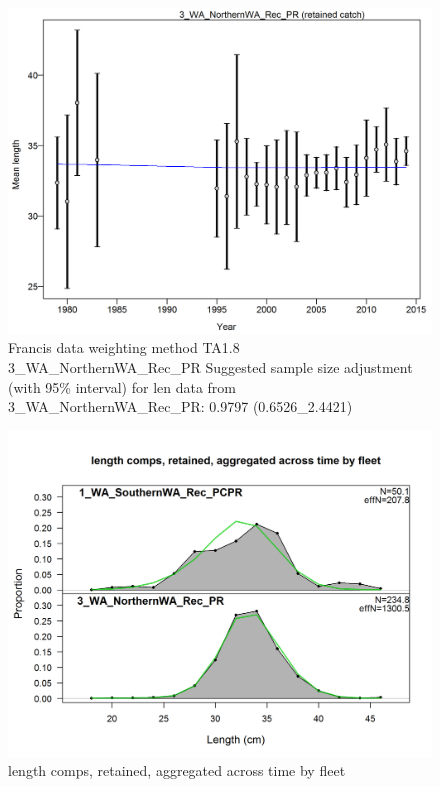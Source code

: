 \documentclass[12pt,]{article}
\begin{document}
\begin{figure}[htbp]
\centering
\includegraphics{./r4ss/plots_mod1/comp_lenfit_data_weighting_TA1.8_3_WA_NorthernWA_Rec_PR.png}
\caption{Francis data weighting method TA1.8 3\_WA\_NorthernWA\_Rec\_PR
Suggested sample size adjustment (with 95\% interval) for len data from
3\_WA\_NorthernWA\_Rec\_PR: 0.9797 (0.6526\_2.4421)
\label{fig:mod1_8_comp_lenfit_data_weighting_TA1.8_3_WA_NorthernWA_Rec_PR}}
\end{figure}

\begin{figure}[htbp]
\centering
\includegraphics{./r4ss/plots_mod1/comp_lenfit_mkt2_aggregated_across_time.png}
\caption{length comps, retained, aggregated across time by fleet
\label{fig:mod1_9_comp_lenfit_mkt2_aggregated_across_time}}
\end{figure}
\end{document}

